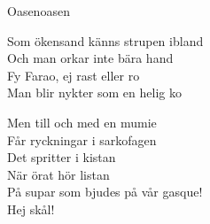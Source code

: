 \begin{song}{Oasen}{oasen}
\begin{vers}
Som ökensand känns strupen ibland\\
Och man orkar inte bära hand\\
Fy Farao, ej rast eller ro\\
Man blir nykter som en helig ko\\
\end{vers}
\begin{vers}
\repopen Men till och med en mumie\\
Får ryckningar i sarkofagen\\
Det spritter i kistan\\
När örat hör listan\\
På supar som bjudes på vår gasque! \repclose\\
Hej skål!\\
\end{vers}
\end{song}
